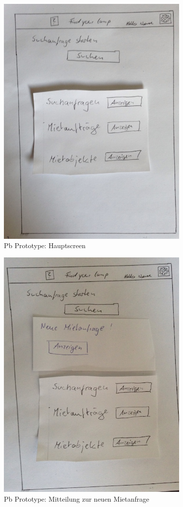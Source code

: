 \begin{figure}[H]
\centering
\includegraphics[angle=90, width=0.85\textwidth]{./images/paperbased/main.JPG}
\caption{Pb Prototype: Hauptscreen}
\label{pbprototype7}
\end{figure}

\begin{figure}[H]
\centering
\includegraphics[angle=90, width=0.85\textwidth]{./images/paperbased/neueMietanfrage.JPG}
\caption{Pb Prototype: Mitteilung zur neuen Mietanfrage}
\label{pbprototype8}
\end{figure}

